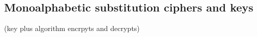 
\subsection{Monoalphabetic substitution ciphers and keys}

(key plus algorithm encrpyts and decrypts)

